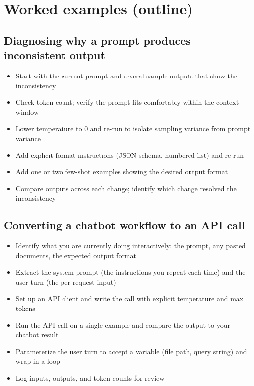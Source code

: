 
\section{Worked examples (outline)}

\subsection{Diagnosing why a prompt produces inconsistent output}
\begin{itemize}[noitemsep,topsep=0pt]
  \item Start with the current prompt and several sample outputs that show the inconsistency
  \item Check token count; verify the prompt fits comfortably within the context window
  \item Lower temperature to 0 and re-run to isolate sampling variance from prompt variance
  \item Add explicit format instructions (JSON schema, numbered list) and re-run
  \item Add one or two few-shot examples showing the desired output format
  \item Compare outputs across each change; identify which change resolved the inconsistency
\end{itemize}

\subsection{Converting a chatbot workflow to an API call}
\begin{itemize}[noitemsep,topsep=0pt]
  \item Identify what you are currently doing interactively: the prompt, any pasted documents, the expected output format
  \item Extract the system prompt (the instructions you repeat each time) and the user turn (the per-request input)
  \item Set up an API client and write the call with explicit temperature and max tokens
  \item Run the API call on a single example and compare the output to your chatbot result
  \item Parameterize the user turn to accept a variable (file path, query string) and wrap in a loop
  \item Log inputs, outputs, and token counts for review
\end{itemize}

